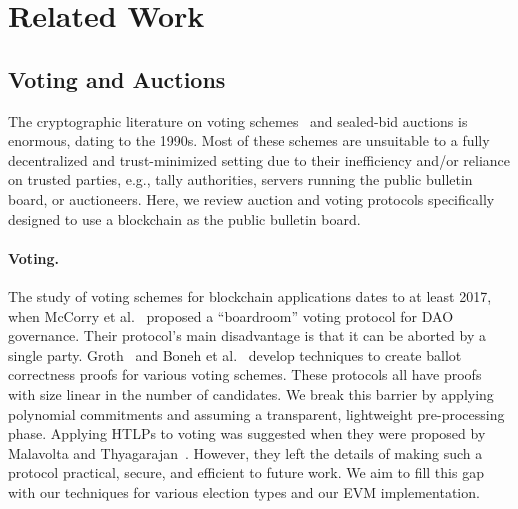 \section{Related Work}

\subsection{Voting and Auctions}
The cryptographic literature on voting schemes~\cite{PoPETS:HMMP23} and sealed-bid auctions \cite{ToSE:FraRei96,HarTygKik98,CCS:Cachin99,ACM_EC:NaoPinSum99,FC:BDJNPT06,FC:BCDGJK09,ACM_EC:PRST06} is enormous, dating to the 1990s. Most of these schemes are unsuitable to a fully decentralized and trust-minimized setting due to their inefficiency and/or reliance on trusted parties, e.g., tally authorities, servers running the public bulletin board, or auctioneers. Here, we review auction and voting protocols specifically designed to use a blockchain as the public bulletin board. 


\paragraph{Voting.} 
The study of voting schemes for blockchain applications dates to at least 2017, when McCorry et al.~\cite{FC:McCShaHao17} proposed a ``boardroom'' voting protocol for DAO governance.
Their protocol's main disadvantage is that it can be aborted by a single party. Groth~\cite{ACNS:Groth05} and Boneh et al.~\cite{C:BBCGI23} develop techniques to create ballot correctness proofs for various voting schemes. These protocols all have proofs with size linear in the number of candidates. We break this barrier by applying polynomial commitments and assuming a transparent, lightweight pre-processing phase. Applying HTLPs to voting was suggested when they were proposed by Malavolta and Thyagarajan~\cite{C:MalThy19}. However, they left the details of making such a protocol practical, secure, and efficient to future work. We aim to fill this gap with our techniques for various election types and our EVM implementation.

